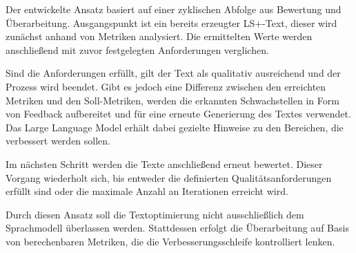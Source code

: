 
Der entwickelte Ansatz basiert auf einer zyklischen Abfolge aus Bewertung und Überarbeitung.
Ausgangspunkt ist ein bereits erzeugter LS+-Text, dieser wird zunächst anhand von Metriken analysiert.
Die ermittelten Werte werden anschließend mit zuvor festgelegten Anforderungen verglichen.

Sind die Anforderungen erfüllt, gilt der Text als qualitativ ausreichend und der Prozess wird beendet.
Gibt es jedoch eine Differenz zwischen den erreichten Metriken und den Soll-Metriken, werden die erkannten Schwachstellen in Form von Feedback aufbereitet und für eine erneute Generierung des Textes verwendet.
Das Large Language Model erhält dabei gezielte Hinweise zu den Bereichen, die verbessert werden sollen.

Im nächsten Schritt werden die Texte anschließend erneut bewertet.
Dieser Vorgang wiederholt sich, bis entweder die definierten Qualitätsanforderungen erfüllt sind oder die maximale Anzahl an Iterationen erreicht wird.

Durch diesen Ansatz soll die Textoptimierung nicht ausschließlich dem Sprachmodell überlassen werden.
Stattdessen erfolgt die Überarbeitung auf Basis von berechenbaren Metriken, die die Verbesserungsschleife kontrolliert lenken.